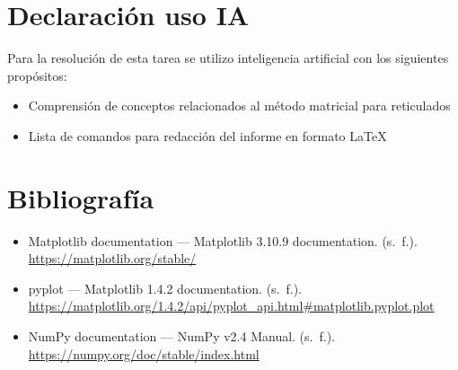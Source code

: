 \documentclass[]{article}
\begin{document}
	\section{Declaración uso IA}
	Para la resolución de esta tarea se utilizo inteligencia artificial con los siguientes propósitos:
	\begin{itemize}
		\item Comprensión de conceptos relacionados al método matricial para reticulados
		\item Lista de comandos para redacción del informe en formato LaTeX
	\end{itemize}

	
	\section{Bibliografía}
	\begin{itemize}
		\item Matplotlib documentation — Matplotlib 3.10.9 documentation. (s. f.). \url{https://matplotlib.org/stable/}
		\item pyplot — Matplotlib 1.4.2 documentation. (s. f.). \url{https://matplotlib.org/1.4.2/api/pyplot_api.html#matplotlib.pyplot.plot}
		\item NumPy documentation — NumPy v2.4 Manual. (s. f.). \url{https://numpy.org/doc/stable/index.html}
		
	\end{itemize}
	
\end{document}
